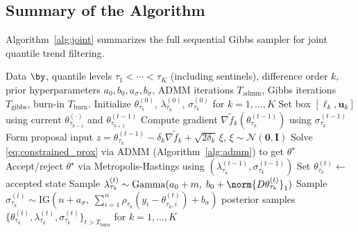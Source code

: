 \subsection{Summary of the Algorithm}
\label{subsec:algorithm}

Algorithm~\ref{alg:joint} summarizes the full sequential Gibbs sampler for joint quantile trend filtering.

\begin{algorithm}[h!]
\caption{Sequential Gibbs Sampler for Joint Bayesian Quantile Trend Filtering}
\label{alg:joint}
\begin{algorithmic}[1]
\Require Data $\by$, quantile levels $\tau_1 < \cdots < \tau_K$ (including sentinels), difference order $k$, prior hyperparameters $a_0, b_0, a_\sigma, b_\sigma$, ADMM iterations $T_{\mathrm{admm}}$, Gibbs iterations $T_{\mathrm{gibbs}}$, burn-in $T_{\mathrm{burn}}$.
\State Initialize $\theta_{\tau_k}^{(0)}$, $\lambda_{\tau_k}^{(0)}$, $\sigma_{\tau_k}^{(0)}$ for $k = 1, \ldots, K$
     
        \State Set box $[\boldsymbol{\ell}_k, \mathbf{u}_k]$ using current $\theta_{\tau_{k-1}}^{(\cdot)}$ and $\theta_{\tau_{k+1}}^{(t-1)}$
        \State Compute gradient $\nabla \tilde{f}_k(\theta_{\tau_k}^{(t-1)})$ using $\sigma_{\tau_k}^{(t-1)}$
        \State Form proposal input $z = \theta_{\tau_k}^{(t-1)} - \delta_k \nabla \tilde{f}_k + \sqrt{2\delta_k}\,\xi$, $\xi \sim \mathcal{N}(\mathbf{0}, \mathbf{I})$
        \State Solve \eqref{eq:constrained_prox} via ADMM (Algorithm~\ref{alg:admm}) to get $\theta^\star$
        \State Accept/reject $\theta^\star$ via Metropolis-Hastings using $(\lambda_{\tau_k}^{(t-1)}, \sigma_{\tau_k}^{(t-1)})$
        \State Set $\theta_{\tau_k}^{(t)} \leftarrow$ accepted state
    \EndFor
     
        \State Sample $\lambda_{\tau_k}^{(t)} \sim \mathrm{Gamma}(a_0 + m,\; b_0 + \norm{D\theta_{\tau_k}^{(t)}}_1)$
    \EndFor
     
        \State Sample $\sigma_{\tau_k}^{(t)} \sim \mathrm{IG}(n + a_\sigma,\; \sum_{i=1}^n \rho_{\tau_k}(y_i - \theta_{\tau_k, i}^{(t)}) + b_\sigma)$
    \EndFor
\EndFor
\State \Return posterior samples $\{\theta_{\tau_k}^{(t)}, \lambda_{\tau_k}^{(t)}, \sigma_{\tau_k}^{(t)}\}_{t > T_{\mathrm{burn}}}$ for $k = 1, \ldots, K$
\end{algorithmic}
\end{algorithm}

